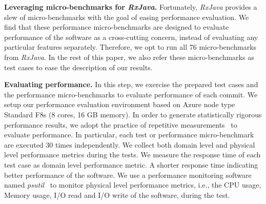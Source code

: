 
\textbf{Leveraging micro-benchmarks for \emph{RxJava}. }Fortunately, \emph{RxJava} provides a slew of micro-benchmarks with the goal of easing performance evaluation. We find that these performance micro-benchmarks are designed to evaluate performance of the software as a cross-cutting concern, instead of evaluating any particular features separately. Therefore, we opt to run all 76 micro-benchmarks from \emph{RxJava}. In the rest of this paper, we also refer these micro-benchmarks as test cases to ease the description of our results.

\textbf{Evaluating performance.}
In this step, we exercise the prepared test cases and the performance micro-benchmarks to evaluate performance of each commit. We setup our performance evaluation environment based on Azure node type Standard F8s (8 cores, 16 GB memory). In order to generate statistically rigorous performance results, we adopt the practice of repetitive measurements~\cite{peterfse} to evaluate performance. 
In particular, each test or performance micro-benchmark are executed 30 times independently. We collect both domain level and physical level performance metrics during the tests. We measure the response time of each test case as domain level performance metric. A shorter response time indicating better performance of the software. We use a performance monitoring software named \emph{psutil}~\cite{psutil} to monitor physical level performance metrics, i.e., the CPU usage, Memory usage, I/O read and I/O write of the software, during the test.

